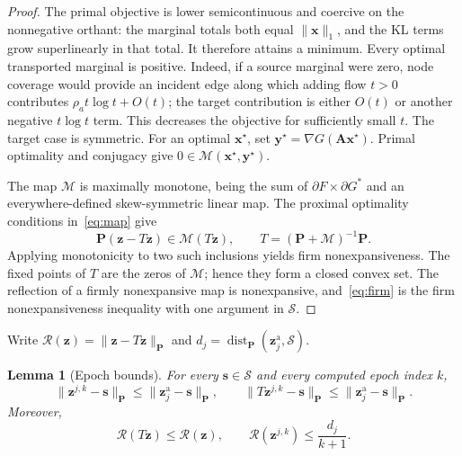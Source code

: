 \documentclass[11pt]{article}
\newtheorem{lemma}[theorem]{Lemma}
\theoremstyle{remark}
\newcommand{\np}[1]{\lVert#1\rVert_{\mathbf P}}
\newcommand{\dd}[1]{\operatorname{dist}_{\mathbf P}(#1,\mathcal S)}
\newcommand{\res}{\mathcal R}
\begin{document}
\begin{proof}
The primal objective is lower semicontinuous and coercive on the nonnegative orthant: the marginal totals both equal $\|\mathbf x\|_1$, and the KL terms grow superlinearly in that total.
It therefore attains a minimum.
Every optimal transported marginal is positive.
Indeed, if a source marginal were zero, node coverage would provide an incident edge along which adding flow $t>0$ contributes $\rho_a t\log t+O(t)$; the target contribution is either $O(t)$ or another negative $t\log t$ term.
This decreases the objective for sufficiently small $t$.
The target case is symmetric.
For an optimal $\mathbf x^\star$, set $\mathbf y^\star=\nabla G(\mathbf A\mathbf x^\star)$.
Primal optimality and conjugacy give $0\in\mathcal M(\mathbf x^\star,\mathbf y^\star)$.

The map $\mathcal M$ is maximally monotone, being the sum of $\partial F\times\partial G^*$ and an everywhere-defined skew-symmetric linear map.
The proximal optimality conditions in~\eqref{eq:map} give
\begin{equation}
\mathbf P(\mathbf z-T\mathbf z)\in\mathcal M(T\mathbf z),\qquad T=(\mathbf P+\mathcal M)^{-1}\mathbf P.
\label{eq:resolvent}
\end{equation}
Applying monotonicity to two such inclusions yields firm nonexpansiveness.
The fixed points of $T$ are the zeros of $\mathcal M$; hence they form a closed convex set.
The reflection of a firmly nonexpansive map is nonexpansive, and~\eqref{eq:firm} is the firm nonexpansiveness inequality with one argument in $\mathcal S$.
\end{proof}

Write $\res(\mathbf z)=\np{\mathbf z-T\mathbf z}$ and $d_j=\dd{\mathbf z_j^{\mathrm a}}$.

\begin{lemma}[Epoch bounds]
\label{lem:epoch}
For every $\mathbf s\in\mathcal S$ and every computed epoch index $k$,
\begin{equation}
\np{\mathbf z^{j,k}-\mathbf s}\leq\np{\mathbf z_j^{\mathrm a}-\mathbf s},\qquad \np{T\mathbf z^{j,k}-\mathbf s}\leq\np{\mathbf z_j^{\mathrm a}-\mathbf s}.
\label{eq:ball}
\end{equation}
Moreover,
\begin{equation}
\res(T\mathbf z)\leq\res(\mathbf z),\qquad \res(\mathbf z^{j,k})\leq\frac{d_j}{k+1}.
\label{eq:residual}
\end{equation}
\end{lemma}
\end{document}
